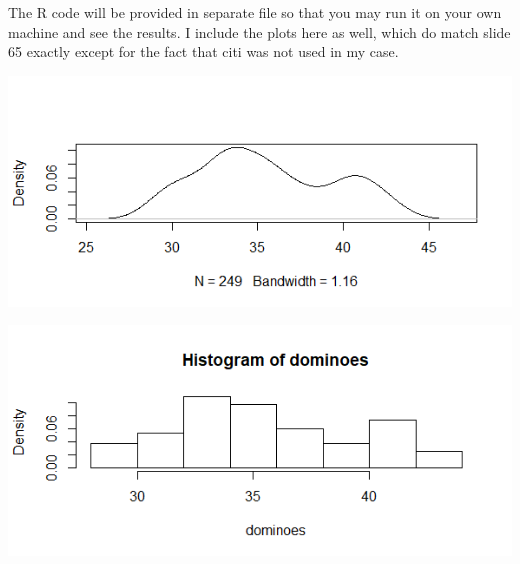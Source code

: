 \documentclass[letterpaper,12pt,fleqn]{article}
\begin{document}
\begin{enumerate}
The R code will be provided in separate file so that you may run it on your own machine and see the results. I include the plots here as well, which do match slide 65 exactly except for the fact that citi was not used in my case.

\begin{center}
    \includegraphics[scale=1]{Rplot}
\end{center}
\begin{center}
    \includegraphics[scale=1]{Rplot01}
\end{center}


\end{enumerate}
\end{document}
